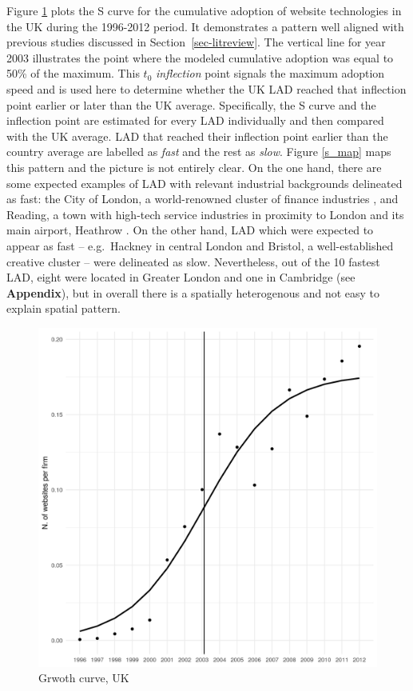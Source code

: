 \documentclass[
  authoryear,
  preprint,
  3p]{elsarticle}
\begin{document}
Figure \ref{s_uk} plots the S curve for the cumulative adoption of
website technologies in the UK during the 1996-2012 period. It
demonstrates a pattern well aligned with previous studies discussed in
Section~\ref{sec-litreview}. The vertical line for year 2003 illustrates
the point where the modeled cumulative adoption was equal to 50\% of the
maximum. This \(t_0\) \emph{inflection} point signals the maximum
adoption speed and is used here to determine whether the UK LAD reached
that inflection point earlier or later than the UK average.
Specifically, the S curve and the inflection point are estimated for
every LAD individually and then compared with the UK average. LAD that
reached their inflection point earlier than the country average are
labelled as \emph{fast} and the rest as \emph{slow}. Figure \ref{s_map}
maps this pattern and the picture is not entirely clear. On the one
hand, there are some expected examples of LAD with relevant industrial
backgrounds delineated as fast: the City of London, a world-renowned
cluster of finance industries \citep{cook2007role}, and Reading, a town
with high-tech service industries in proximity to London and its main
airport, Heathrow \citep{england2005polynet}. On the other hand, LAD
which were expected to appear as fast -- e.g.~Hackney in central London
and Bristol, a well-established creative cluster
\citep{oatley1999cultural, bassett2002cultural} -- were delineated as
slow. Nevertheless, out of the 10 fastest LAD, eight were located in
Greater London and one in Cambridge (see \textbf{Appendix}), but in
overall there is a spatially heterogenous and not easy to explain
spatial pattern.

\begin{figure}[H]

{\centering \includegraphics[width=1\textwidth,height=\textheight]{../../outputs/s/s_uk_per_firm.png}

}

\caption{\label{s_uk}Grwoth curve, UK}

\end{figure}%
\end{document}
